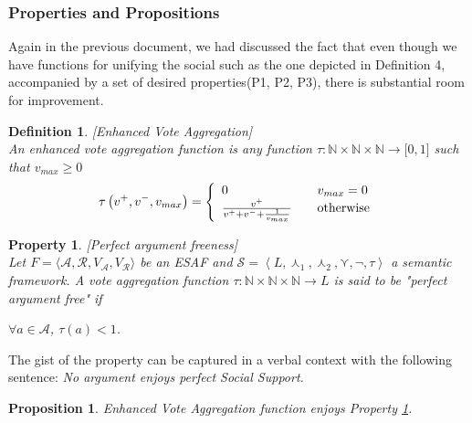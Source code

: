 \documentclass{article}
\newtheorem{definition}{Definition}
\newtheorem{property}{Property}
\newtheorem{proposition}{Proposition}
\newcommand{\nat}{\mathbb{N}}   %
\newcommand{\args}{\mathcal{A}} %
\newcommand{\att}{\mathcal{R}}  %
\newcommand{\valueset}{L}
\newcommand{\varg}{V_{\args}}   %
\newcommand{\vatt}{V_{\att}}   %
\newcommand{\safid}{F}               %
\newcommand{\saf}{\safid = \safbody} %
\newcommand{\safbody}{\langle \args, \att, \varg, \vatt \rangle} %
\newcommand{\semid}{\mathcal{S}}        %
\newcommand{\sembody}{\left\langle \valueset,\SAFand_1, \SAFand_2,\SAFor,\lnot,\tau \right\rangle}
\newcommand{\semdef}{\semid = \sembody}     %
\newcommand{\SAFand}{\curlywedge}     %
\newcommand{\SAFor}{\curlyvee}        %
\begin{document}
\subsubsection{Properties and Propositions}

Again in the previous document, we had discussed the fact that even though we have functions for unifying the social such as the one depicted in Definition 4, accompanied by a set of desired properties(P1, P2, P3), there is substantial room for improvement. 



\begin{definition}
\label{def:voteAgg}
[Enhanced Vote Aggregation]
\\ An enhanced vote aggregation function is any function
$\tau:
\mathbb{N} \times \mathbb{N} \times \mathbb{N}
\rightarrow\lbrack0,1]$ such that $v_{max}\geq0$
\[
\tau\left(  v^{+},v^{-}, v_{max}\right)  =\left\{
\begin{array}
[c]{lll}
0 &  & v_{max}=0\\
\frac{v^{+}}{v^{+}+v^{-}+\frac{1}{v_{max}}} &  & \text{otherwise}
\end{array}
\right.
\]

\end{definition}

{\color{red}
\begin{property}
\label{P1} [Perfect argument freeness] \\
Let $\saf$ be an ESAF and $\semdef$ a semantic framework. A vote aggregation function $\tau : \nat \times \nat \times \nat \to L$ is said to be "perfect argument free" if
\begin{center}
$\forall a \in \mathcal{A}$, $\tau \left(a\right) < 1$. %
\end{center}
\end{property}
}

The gist of the property can be captured in a verbal context with the following sentence: \emph{No argument enjoys perfect Social Support.}  \\

\begin{proposition}
Enhanced Vote Aggregation function enjoys Property \ref{P1}.
\end{proposition}
\end{document}
